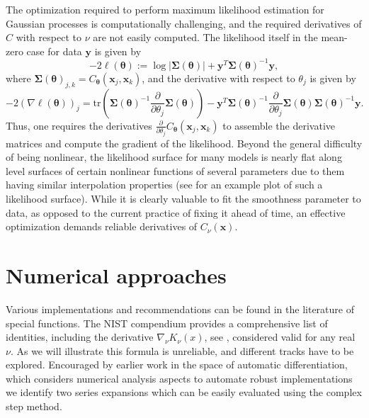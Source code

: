 \documentclass{article}
\begin{document}
The optimization required to perform
maximum likelihood estimation for Gaussian processes is computationally  challenging,
and the required derivatives of $C$ with respect to $\nu$ are not easily
computed. The likelihood itself in the mean-zero case for data $\bm{y}$ is given
by
\begin{equation*} %
  -2 \ell(\bm{\theta}) := 
  \log \left\vert \bm{\Sigma}(\bm{\theta}) \right\vert 
  + 
  \bm{y}^T \bm{\Sigma}(\bm{\theta})^{-1} \bm{y},
\end{equation*}
where $\bm{\Sigma}(\bm{\theta})_{j,k} = C_{\bm{\theta}}(\bm{x}_j, \bm{x}_k)$,
and the derivative with respect to $\theta_j$ is given by
\begin{equation*} %
  -2 (\nabla \ell(\bm{\theta}))_j = 
  \text{tr}\left(
  \bm{\Sigma}(\bm{\theta})^{-1} 
  \frac{\partial}{\partial\theta_j} \bm{\Sigma}(\bm{\theta}) 
  \right)
  - 
  \bm{y}^T 
  \bm{\Sigma}(\bm{\theta})^{-1} 
  \frac{\partial}{\partial\theta_j}\bm{\Sigma}(\bm{\theta})  
  \bm{\Sigma}(\bm{\theta})^{-1}
  \bm{y}.
\end{equation*}
Thus, one requires the derivatives $\frac{\partial}{\partial\theta_j}
C_{\bm{\theta}}(\bm{x}_j, \bm{x}_k)$ to assemble the derivative matrices and
compute the gradient of the likelihood. Beyond the general difficulty of being
nonlinear, the likelihood surface for many models is nearly flat along level
surfaces of certain nonlinear functions of several parameters due to them having
similar interpolation properties (see \cite{stein2013} for an example plot of
such a likelihood surface). While it is clearly valuable to fit the
smoothness parameter to data, as opposed to the current practice of fixing it ahead of time, an effective optimization demands reliable derivatives 
 of $C_\nu(\bm{x})$.

\section{Numerical approaches}\label{sec:numerics}
Various implementations and recommendations can be found in the literature of special functions. The NIST compendium \cite{NIST} provides a comprehensive list of identities, including the derivative $\nabla_{\nu}K_{\nu}(x)$, see \cite[Eq.10.38.2]{NIST}, considered valid for any real $\nu$. 
As we will illustrate this formula is unreliable, and different tracks have to be explored. Encouraged by earlier work in the space of automatic differentiation, which considers numerical analysis aspects to automate robust implementations \cite{charpentier2015,charpentier2018,griewank1993,fike2012automatic} we identify two series expansions which can be easily evaluated using the complex step method. 
\end{document}
